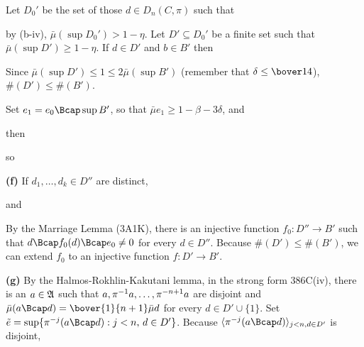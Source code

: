 {Let $D_0'$ be the set of those $d\in D_n(C,\pi)$ such that


\noindent by (b-iv), $\bar\mu(\sup D_0')>1-\eta$.   Let
$D'\subseteq D_0'$ be a finite set such that
$\bar\mu(\sup D')\ge 1-\eta$.   If $d\in D'$ and $b\in B'$ then


\noindent Since $\bar\mu(\sup D')\le 1\le 2\bar\mu(\sup B')$ (remember
that $\delta\le\bover14$), $\#(D')\le\#(B')$.

Set $e_1=e_0\Bcap\sup B'$, so that $\bar\mu e_1\ge 1-\beta-3\delta$, and


\noindent then


\noindent so


\medskip

{\bf (f)} If $d_1,\ldots,d_k\in D''$ are distinct,


\noindent and

\noindent By the Marriage Lemma (3A1K), there is an injective function
$f_0:D''\to B'$ such that $d\Bcap f_0(d)\Bcap e_0\ne 0$ for every
$d\in D''$.   Because $\#(D')\le\#(B')$, we can extend $f_0$ to an
injective function $f:D'\to B'$.

\medskip

{\bf (g)} By the Halmos-Rokhlin-Kakutani lemma, in the strong form
386C(iv), there is an $a\in\frak A$ such that
$a,\pi^{-1}a,\ldots,\discretionary{}{}{}\pi^{-n+1}a$ are disjoint
and $\bar\mu(a\Bcap d)=\bover{1}{n+1}\bar\mu d$ for every
$d\in D'\cup\{1\}$.
Set $\tilde e=\sup\{\pi^{-j}(a\Bcap d):j<n,\,d\in D'\}$.   Because
$\langle\pi^{-j}(a\Bcap d)\rangle_{j<n,d\in D'}$ is disjoint,


}
